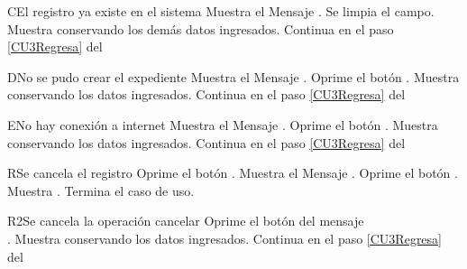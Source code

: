 \begin{UCtrayectoriaA}{C}{El registro ya existe en el sistema}
    \UCpaso Muestra el Mensaje \textbf{}.
    \UCpaso Se limpia el campo.
    \UCpaso Muestra  conservando los demás datos ingresados.
	\UCpaso Continua en el paso \ref{CU3Regresa} del 
\end{UCtrayectoriaA}

\begin{UCtrayectoriaA}{D}{No se pudo crear el expediente}
    \UCpaso Muestra el Mensaje \textbf{}.
    \UCpaso[\UCactor] Oprime el botón .
    \UCpaso Muestra  conservando los datos ingresados.
    \UCpaso Continua en el paso \ref{CU3Regresa} del 
\end{UCtrayectoriaA}

\begin{UCtrayectoriaA}{E}{No hay conexión a internet}
    \UCpaso Muestra el Mensaje \textbf{}.
    \UCpaso[\UCactor] Oprime el botón .
    \UCpaso Muestra  conservando los datos ingresados.
    \UCpaso Continua en el paso \ref{CU3Regresa} del 
\end{UCtrayectoriaA}

\begin{UCtrayectoriaA}{R}{Se cancela el registro}
	\UCpaso[\UCactor] Oprime el botón .
	\UCpaso Muestra el Mensaje \textbf{}.
    \UCpaso[\UCactor] Oprime el botón . 
	\UCpaso Muestra .
	\UCpaso Termina el caso de uso.
\end{UCtrayectoriaA}

\begin{UCtrayectoriaA}{R2}{Se cancela la operación cancelar}
    \UCpaso[\UCactor] Oprime el botón  del mensaje
        \\\textbf{}.
    \UCpaso Muestra  conservando los datos ingresados.
    \UCpaso Continua en el paso \ref{CU3Regresa} del 
\end{UCtrayectoriaA}
		
